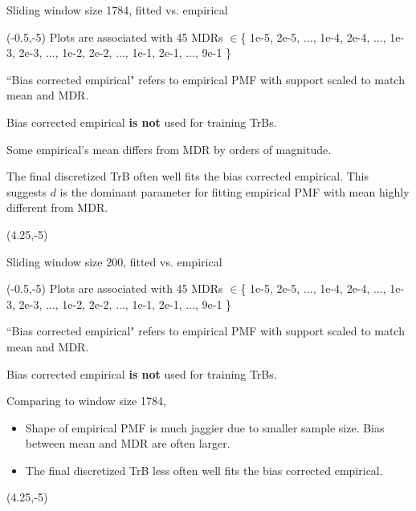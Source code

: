 \documentclass[aspectratio=169]{beamer}
\begin{document}
\begin{frame}{Sliding window size 1784, fitted vs. empirical}
\begin{textblock}{4.1}(-0.5,-5)
\scriptsize Plots are associated with 45 MDRs $\in$\{ 1e-5, 2e-5, $\ldots$, 1e-4, 2e-4, $\ldots$, 1e-3, 2e-3, $\ldots$, 1e-2, 2e-2, $\ldots$, 1e-1, 2e-1, $\ldots$, 9e-1 \}\medskip\pause

\scriptsize ``Bias corrected empirical" refers to empirical PMF with support scaled to match mean and MDR.\medskip

\scriptsize Bias corrected empirical \textbf{is not} used for training TrBs.\medskip\pause

\scriptsize Some empirical's mean differs from MDR by orders of magnitude.\medskip\pause

\scriptsize The final discretized TrB often well fits the bias corrected empirical. This suggests $d$ is the dominant parameter for fitting empirical PMF with mean highly different from MDR.  

\end{textblock}

\begin{textblock}{1}(4.25,-5)
\end{textblock}
\end{frame}



\begin{frame}{Sliding window size 200, fitted vs. empirical}
\begin{textblock}{4.1}(-0.5,-5)
\scriptsize Plots are associated with 45 MDRs $\in$\{ 1e-5, 2e-5, $\ldots$, 1e-4, 2e-4, $\ldots$, 1e-3, 2e-3, $\ldots$, 1e-2, 2e-2, $\ldots$, 1e-1, 2e-1, $\ldots$, 9e-1 \}\medskip

\scriptsize ``Bias corrected empirical" refers to empirical PMF with support scaled to match mean and MDR.\medskip

\scriptsize Bias corrected empirical \textbf{is not} used for training TrBs.\medskip

\scriptsize Comparing to window size 1784,\medskip

\begin{itemize}
 
\item\scriptsize Shape of empirical PMF is much jaggier due to smaller sample size. Bias between mean and MDR are often larger.
\medskip

\item\scriptsize The final discretized TrB less often well fits the bias corrected empirical. 

\end{itemize}


\end{textblock}

\begin{textblock}{1}(4.25,-5)
\end{textblock}
\end{frame}
\end{document}
